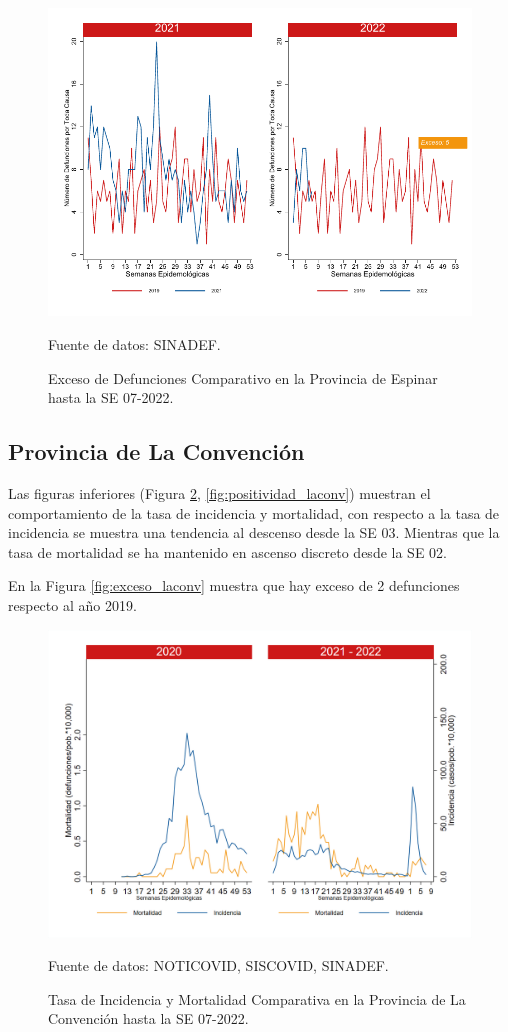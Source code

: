\documentclass[12pt,a4paper,openany]{book}
\begin{document}
		\begin{figure}[h]
			\caption{Exceso de Defunciones Comparativo en la Provincia de Espinar hasta la SE 07-2022.}\label{fig:exceso_espinar}
			\begin{center}
				\includegraphics[width=0.7\linewidth]{../figuras/exceso_8.pdf}
			\end{center}
			{\footnotesize {Fuente de datos: SINADEF.}}
		\end{figure}
		
		\clearpage
		
		\subsection*{Provincia de La Convención}
		\noindent Las figuras inferiores (Figura \ref{fig:inc_mort_laconv}, \ref{fig:positividad_laconv}) muestran el comportamiento de la tasa de incidencia y mortalidad, con respecto a la tasa de incidencia se muestra una tendencia al descenso desde la SE 03. Mientras que la tasa de mortalidad se ha mantenido en ascenso discreto desde la SE 02. 
	
	En la Figura \ref{fig:exceso_laconv}  muestra que hay exceso de 2 defunciones respecto al año 2019.     
	
		\begin{figure}[h]
			\caption{Tasa de Incidencia y Mortalidad Comparativa en la Provincia de La Convención hasta la SE 07-2022.}\label{fig:inc_mort_laconv}
			\begin{center}
				\includegraphics[width=0.85\linewidth]{../figuras/incidencia_mortalidad_20_21_9.png}
			\end{center}
			{\footnotesize {Fuente de datos: NOTICOVID, SISCOVID, SINADEF.}}
		\end{figure}
		
\end{document}
